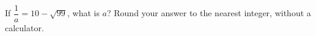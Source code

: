 If $\dfrac{1}{a}=10-\sqrt{99}$, what is $a$? Round your answer to the nearest integer, without a calculator.

